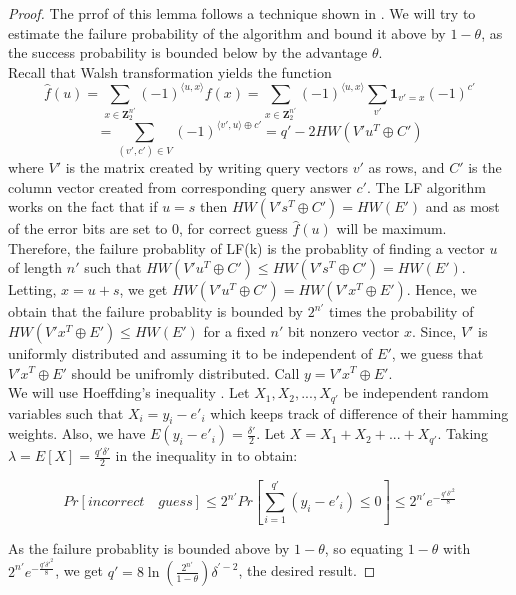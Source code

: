 \documentclass{article}
\begin{document}
  \begin{proof}
  	 The prrof of this lemma follows a technique shown in \cite{LPNjournal}. We will try to estimate the failure probability of the algorithm and bound it above by $1-\theta$, as the success probability is bounded below by the advantage $\theta$.\\
  	 
  	 Recall that Walsh transformation yields the function $$\hat{f}(u)=\sum_{x\in\mathbf{Z}_2^{n'}}(-1)^{\langle u,x\rangle}f(x) = \sum_{x\in\mathbf{Z}_2^{n'}}(-1)^{\langle u,x\rangle}\sum_{v'}\mathbf{1}_{v'=x}(-1)^{c'} $$ $$= \sum_{(v',c')\in V}(-1)^{\langle v',u\rangle \oplus c'}=q' - 2HW(V'u^T\oplus C')$$ where $V'$ is the matrix created by writing query vectors $v'$ as rows, and $C'$ is the column vector created from corresponding query answer $c'$. The LF algorithm works on the fact that if $u=s$ then $HW(V's^T\oplus C')=HW(E')$ and as most of the error bits are set to $0$, for correct guess $\hat{f}(u)$ will be maximum.\\
  	 
  	 Therefore, the failure probablity of LF(k) is the probablity of finding a vector $u$ of length $n'$ such that $HW(V'u^T\oplus C')\le HW(V's^T\oplus C')=HW(E')$. Letting, $x=u+s$, we get $HW(V'u^T\oplus C')=HW(V'x^T\oplus E')$. Hence, we obtain that the failure probablity is bounded by $2^{n'}$ times the probability of $HW(V'x^T\oplus E')\le HW(E')$ for a fixed $n'$ bit nonzero vector $x$. Since, $V'$ is uniformly distributed and assuming it to be independent of $E'$, we guess that $V'x^T\oplus E'$ should be unifromly distributed. Call $y=V'x^T\oplus E'$.\\
  	 
  	 We will use Hoeffding's inequality \cite{hoeffding}. Let $X_1, X_2, ..., X_{q'}$ be independent random variables such that $X_i = y_i-e'_i$ which keeps track of difference of their hamming weights. Also, we have $E(y_i-e'_i)=\frac{\delta'}{2}$. Let $X=X_1+X_2+...+X_{q'}$. Taking $\lambda = E[X]=\frac{q'\delta'}{2}$ in the inequality in \cite{hoeffding} to obtain:
  	 
  	 $$Pr[incorrect\quad guess]\leq 2^{n'}Pr[\sum_{i=1}^{q'}(y_i-e'_i)\le 0]\leq 2^{n'}e^{-\frac{q'\delta'^2}{8}}$$
  	 
  	 As the failure probablity is bounded above by $1-\theta$, so equating $1-\theta$ with $2^{n'}e^{-\frac{q'\delta'^2}{8}}$, we get $q'= 8\ln(\frac{2^{n'}}{1-\theta})\delta^{'-2}$, the desired result. 
  \end{proof}
   
\end{document}

